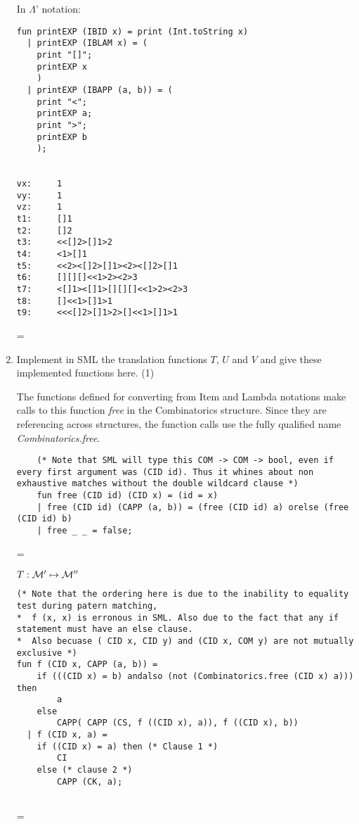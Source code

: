 \documentclass[11pt]{article}
\newenvironment{neverbreak} %
{\par\nobreak\vfil\penalty0\vfilneg
	\vtop\bgroup}
{\par\xdef\tpd{\the\prevdepth}\egroup
	\prevdepth=\tpd}
\begin{document}
\begin{enumerate}
\vspace{1cm}
\begin{neverbreak}
	In $\Lambda$' notation:
	\begin{verbatim}
fun printEXP (IBID x) = print (Int.toString x)
  | printEXP (IBLAM x) = (
	print "[]";
	printEXP x
	)
  | printEXP (IBAPP (a, b)) = (
	print "<";
	printEXP a;
	print ">";
	printEXP b
	);


vx:     1
vy:     1
vz:     1
t1:     []1
t2:     []2
t3:     <<[]2>[]1>2
t4:     <1>[]1
t5:     <<2><[]2>[]1><2><[]2>[]1
t6:     [][][]<<1>2><2>3
t7:     <[]1><[]1>[][][]<<1>2><2>3
t8:     []<<1>[]1>1
t9:     <<<[]2>[]1>2>[]<<1>[]1>1
	\end{verbatim}
\end{neverbreak}

\pagebreak
\item
Implement in SML the translation functions $T$, $U$ and $V$ and give these implemented functions here.
\hfill{(1)}\\ %

\begin{neverbreak}
	The functions defined for converting from Item and Lambda notations make calls to this function \textit{free} in the Combinatorics structure. Since they are referencing across structures, the function calls use the fully qualified name \textit{Combinatorics.free}.
	\begin{verbatim}
	(* Note that SML will type this COM -> COM -> bool, even if every first argument was (CID id). Thus it whines about non exhaustive matches without the double wildcard clause *)
	fun free (CID id) (CID x) = (id = x)
	| free (CID id) (CAPP (a, b)) = (free (CID id) a) orelse (free (CID id) b) 
	| free _ _ = false;
	\end{verbatim}
\end{neverbreak}

\begin{neverbreak}
	$T:{\cal M}'\mapsto {\cal M}''$\\
	\begin{verbatim}
(* Note that the ordering here is due to the inability to equality test during patern matching, 
*  f (x, x) is erronous in SML. Also due to the fact that any if statement must have an else clause. 
*  Also becuase ( CID x, CID y) and (CID x, COM y) are not mutually exclusive *)
fun f (CID x, CAPP (a, b)) = 
	if (((CID x) = b) andalso (not (Combinatorics.free (CID x) a))) then
		a
	else
		CAPP( CAPP (CS, f ((CID x), a)), f ((CID x), b))
  | f (CID x, a) =
	if ((CID x) = a) then (* Clause 1 *)
		CI 
	else (* clause 2 *)
		CAPP (CK, a);


\end{verbatim}
\end{neverbreak}
\end{enumerate}
\end{document}
